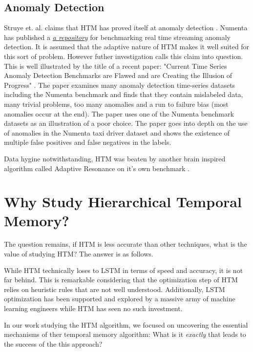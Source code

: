 \documentclass{article}
\begin{document}
\subsection*{Anomaly Detection}

Struye et. al. claims that HTM has proved itself at anomaly detection \cite{Struye2020}. Numenta has published a \textit{\href{https://github.com/numenta/NAB}{a repository}} for benchmarking real time streaming anomaly detection. It is assumed that the adaptive nature of HTM makes it well suited for this sort of problem. However futher investigation calls this claim into question. This is well illustrated by the title of a recent paper: "Current Time Series Anomaly Detection Benchmarks are Flawed and are Creating the Illusion of Progress" \cite{Wu2021}. The paper examines many anomaly detection time-series datasets including the Numenta benchmark and finds that they contain mislabeled data, many trivial problems, too many anomalies and a run to failure bias (most anomalies occur at the end). The paper uses one of the Numenta benchmark datasets as an illustration of a poor choice. The paper goes into depth on the use of anomalies in the Numenta taxi driver dataset and shows the existence of multiple false positives and false negatives in the labels. 

Data hygine notwithstanding, HTM was beaten by another brain inspired algorithm called Adaptive Resonance on it's own benchmark \cite{Britodasilva2019}.

\section*{Why Study Hierarchical Temporal Memory?}

The question remains, if HTM is less accurate than other techniques, what is the value of studying HTM? The answer is as follows.

While HTM technically loses to LSTM in terms of speed and accuracy, it is not far behind. This is remarkable considering that the optimization step of HTM relies on heuristic rules that are not well understood. Additionally, LSTM optimization has been supported and explored by a massive army of machine learning engineers while HTM has seen no such investment.

In our work studying the HTM algorithm, we focused on uncovering the essential mechanisms of ther temporal memory algorithm: What is it \textit{exactly} that leads to the success of the this approach?
\end{document}
